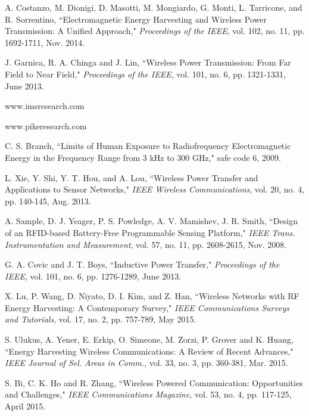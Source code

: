 \documentclass[twocolumn,10pt]{IEEEtran}
\begin{document}
\begin{thebibliography}{99}

A. Costanzo, M. Dionigi, D. Masotti, M. Mongiardo, G. Monti, L. Tarricone, and R. Sorrentino, ``Electromagnetic Energy Harvesting and Wireless Power Transmission: A Unified Approach," \emph{Proceedings of the IEEE}, vol. 102, no. 11, pp. 1692-1711, Nov. 2014.

J. Garnica, R. A. Chinga and J. Lin, ``Wireless Power Transmission: From Far Field to Near Field," \emph{Proceedings of the IEEE}, vol. 101, no. 6, pp. 1321-1331, June 2013.



www.imsresearch.com


www.pikeresearch.com
 
C. S. Branch, ``Limits of Human Exposure to Radiofrequency Electromagnetic Energy in the Frequency Range from 3 kHz to 300 GHz," safe code 6, 2009.

L. Xie, Y. Shi, Y. T. Hou, and A. Lou, ``Wireless Power Transfer and Applications to Sensor Networks," \emph{IEEE Wireless Communications}, 
vol. 20, no. 4, pp. 140-145, Aug. 2013.

A. Sample,  D. J. Yeager, P. S. Powledge,  A. V. Mamishev, J. R. Smith, ``Design of an RFID-based Battery-Free
Programmable Sensing Platform," \emph{IEEE Trans. Instrumentation
and Measurement}, vol. 57, no. 11, pp. 2608-2615, Nov. 2008. 
 
 
G. A. Covic and J. T.  Boys, ``Inductive Power Transfer,"  
\emph{Proceedings of the IEEE}, vol. 101, no. 6, pp. 1276-1289, June 2013.


X. Lu, P. Wang, D. Niyato, D. I. Kim, and Z. Han, ``Wireless Networks with RF Energy Harvesting: A Contemporary Survey,"  \emph{IEEE Communications Surveys and Tutorials}, vol. 17, no. 2, pp. 757-789, May 2015.




S. Ulukus, A. Yener, E. Erkip, O. Simeone, M. Zorzi, P. Grover and K. Huang, ``Energy Harvesting Wireless Communications: A Review of Recent Advances," \emph{IEEE Journal of Sel. Areas in Comm.}, vol. 33, no. 3, pp. 360-381, Mar. 2015.

S. Bi, C. K. Ho and R. Zhang, ``Wireless Powered Communication: Opportunities and Challenges," \emph{IEEE Communications Magazine},  
vol. 53, no. 4,	pp. 117-125,  April  2015.




\end{thebibliography}
\end{document}
